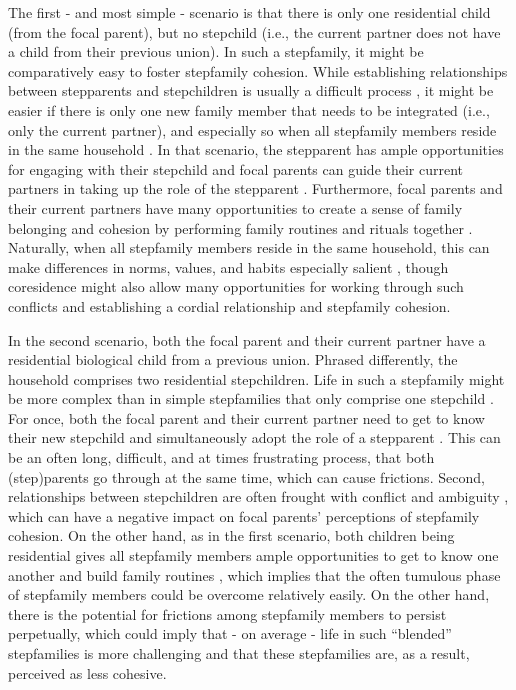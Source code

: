 \documentclass[\pandocDocMode,longtable,floatsintext]{apa6}
\begin{document}
The first - and most simple - scenario is that there is only one
residential child (from the focal parent), but no stepchild (i.e., the
current partner does not have a child from their previous union). In
such a stepfamily, it might be comparatively easy to foster stepfamily
cohesion. While establishing relationships between stepparents and
stepchildren is usually a difficult process
\autocite{ganong2017stepfamily}, it might be easier if there is only one
new family member that needs to be integrated (i.e., only the current
partner)\autocite[
\textcite{pylyser2018stepfamilies}]{gennetian2005one}, and especially so
when all stepfamily members reside in the same household
\autocite{arat2022parental}. In that scenario, the stepparent has ample
opportunities for engaging with their stepchild
\autocite{landon2022stop} and focal parents can guide their current
partners in taking up the role of the stepparent \autocite[
\textcite{ceballo2004gaining}]{ganong2011patterns}. Furthermore, focal
parents and their current partners have many opportunities to create a
sense of family belonging and cohesion by performing family routines and
rituals together \autocite{fang2022family}. Naturally, when all
stepfamily members reside in the same household, this can make
differences in norms, values, and habits especially salient
\autocite{landon2022stop}, though coresidence might also allow many
opportunities for working through such conflicts and establishing a
cordial relationship and stepfamily cohesion.

In the second scenario, both the focal parent and their current partner
have a residential biological child from a previous union. Phrased
differently, the household comprises two residential stepchildren. Life
in such a stepfamily might be more complex than in simple stepfamilies
that only comprise one stepchild \autocite{landon2022stop}. For once,
both the focal parent and their current partner need to get to know
their new stepchild and simultaneously adopt the role of a stepparent
\autocite{pylyser2018stepfamilies}. This can be an often long,
difficult, and at times frustrating process, that both (step)parents go
through at the same time, which can cause frictions. Second,
relationships between stepchildren are often frought with conflict and
ambiguity \autocite[ \textcite{sanner2018half}]{landon2022stop}, which
can have a negative impact on focal parents' perceptions of stepfamily
cohesion. On the other hand, as in the first scenario, both children
being residential gives all stepfamily members ample opportunities to
get to know one another and build family routines
\autocite{landon2022stop}, which implies that the often tumulous phase
of stepfamily members could be overcome relatively easily. On the other
hand, there is the potential for frictions among stepfamily members to
persist perpetually, which could imply that - on average - life in such
``blended'' stepfamilies is more challenging and that these stepfamilies
are, as a result, perceived as less cohesive.
\end{document}
